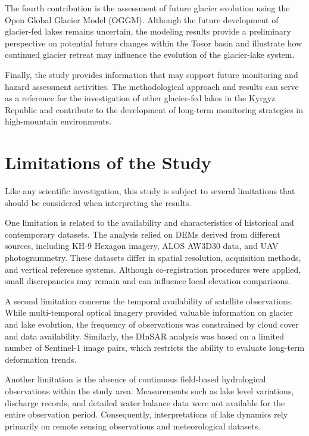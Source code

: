 \documentclass[12pt,a4paper]{report}
\begin{document}
The fourth contribution is the assessment of future glacier evolution using the Open Global Glacier Model (OGGM). Although the future development of glacier-fed lakes remains uncertain, the modeling results provide a preliminary perspective on potential future changes within the Tosor basin and illustrate how continued glacier retreat may influence the evolution of the glacier-lake system.

Finally, the study provides information that may support future monitoring and hazard assessment activities. The methodological approach and results can serve as a reference for the investigation of other glacier-fed lakes in the Kyrgyz Republic and contribute to the development of long-term monitoring strategies in high-mountain environments.

\section{Limitations of the Study}

Like any scientific investigation, this study is subject to several limitations that should be considered when interpreting the results.

One limitation is related to the availability and characteristics of historical and contemporary datasets. The analysis relied on DEMs derived from different sources, including KH-9 Hexagon imagery, ALOS AW3D30 data, and UAV photogrammetry. These datasets differ in spatial resolution, acquisition methods, and vertical reference systems. Although co-registration procedures were applied, small discrepancies may remain and can influence local elevation comparisons.

A second limitation concerns the temporal availability of satellite observations. While multi-temporal optical imagery provided valuable information on glacier and lake evolution, the frequency of observations was constrained by cloud cover and data availability. Similarly, the DInSAR analysis was based on a limited number of Sentinel-1 image pairs, which restricts the ability to evaluate long-term deformation trends.

Another limitation is the absence of continuous field-based hydrological observations within the study area. Measurements such as lake level variations, discharge records, and detailed water balance data were not available for the entire observation period. Consequently, interpretations of lake dynamics rely primarily on remote sensing observations and meteorological datasets.
\end{document}
